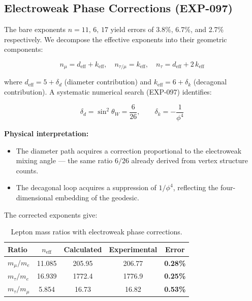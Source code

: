 \documentclass[12pt,a4paper]{article}
\begin{document}
\subsection{Electroweak Phase Corrections (EXP-097)}

The bare exponents $n=11,\,6,\,17$ yield errors of 3.8\%, 6.7\%, and 2.7\% respectively. We decompose the effective exponents into their geometric components:

\begin{equation}
n_\mu = d_{\text{eff}} + k_{\text{eff}}, \quad
n_{\tau/\mu} = k_{\text{eff}}, \quad
n_\tau = d_{\text{eff}} + 2\,k_{\text{eff}}
\end{equation}

where $d_{\text{eff}} = 5 + \delta_d$ (diameter contribution) and $k_{\text{eff}} = 6 + \delta_k$ (decagonal contribution). A systematic numerical search (EXP-097) identifies:

\begin{equation}
\boxed{
\delta_d = \sin^2\theta_W = \frac{6}{26}, \qquad
\delta_k = -\frac{1}{\phi^4}
}
\end{equation}

\textbf{Physical interpretation:}
\begin{itemize}
    \item The diameter path acquires a correction proportional to the electroweak mixing angle --- the same ratio $6/26$ already derived from vertex structure counts.
    \item The decagonal loop acquires a suppression of $1/\phi^4$, reflecting the four-dimensional embedding of the geodesic.
\end{itemize}

The corrected exponents give:

\begin{table}[H]
\centering
\begin{tabular}{lcccc}
\toprule
\textbf{Ratio} & \textbf{$n_{\text{eff}}$} & \textbf{Calculated} & \textbf{Experimental} & \textbf{Error} \\
\midrule
$m_\mu/m_e$ & 11.085 & 205.95 & 206.77 & \textbf{0.28\%} \\
$m_\tau/m_e$ & 16.939 & 1772.4 & 1776.9 & \textbf{0.25\%} \\
$m_\tau/m_\mu$ & 5.854 & 16.73 & 16.82 & \textbf{0.53\%} \\
\bottomrule
\end{tabular}
\caption{Lepton mass ratios with electroweak phase corrections.}
\end{table}
\end{document}
